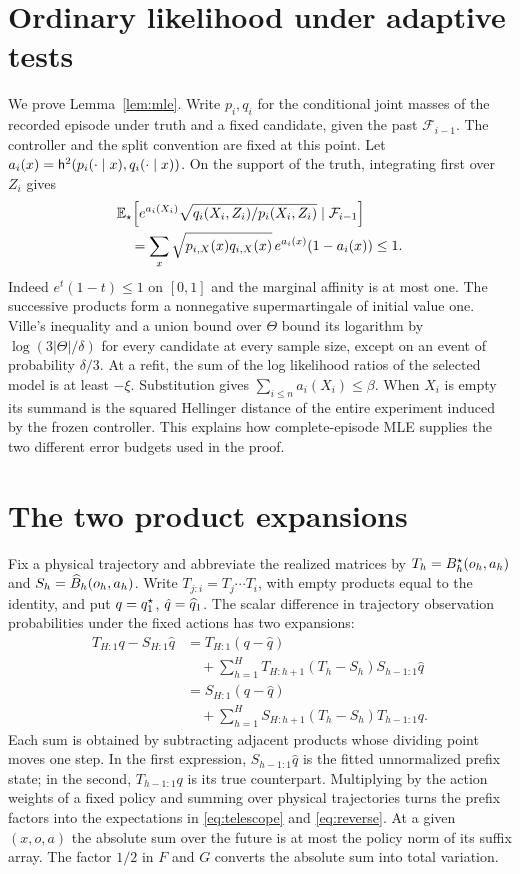 \section{Ordinary likelihood under adaptive tests}\label{app:likelihood}
We prove Lemma~\ref{lem:mle}. Write $p_i,q_i$ for the conditional joint masses of the recorded episode under truth and a fixed candidate, given the past $\mathcal F_{i-1}$. The controller and the split convention are fixed at this point. Let $a_i(x)=\mathsf h^2(p_i(\cdot\mid x),q_i(\cdot\mid x))$. On the support of the truth, integrating first over $Z_i$ gives
\begin{align*}
 &\mathbb E_\star\!\left[e^{a_i(X_i)}
 \sqrt{q_i(X_i,Z_i)/p_i(X_i,Z_i)}\mid\mathcal F_{i-1}\right]\\
 &\quad=\sum_x\sqrt{p_{i,X}(x)q_{i,X}(x)}
       \,e^{a_i(x)}(1-a_i(x))\le1 .
\end{align*}
Indeed $e^t(1-t)\le1$ on $[0,1]$ and the marginal affinity is at most one. The successive products form a nonnegative supermartingale of initial value one. Ville's inequality and a union bound over $\Theta$ bound its logarithm by $\log(3|\Theta|/\delta)$ for every candidate at every sample size, except on an event of probability $\delta/3$. At a refit, the sum of the log likelihood ratios of the selected model is at least $-\xi$. Substitution gives $\sum_{i\le n}a_i(X_i)\le\beta$. When $X_i$ is empty its summand is the squared Hellinger distance of the entire experiment induced by the frozen controller. This explains how complete-episode MLE supplies the two different error budgets used in the proof.

\section{The two product expansions}\label{app:product}
Fix a physical trajectory and abbreviate the realized matrices by $T_h=B_h^\star(o_h,a_h)$ and $S_h=\widehat B_h(o_h,a_h)$. Write $T_{j:i}=T_j\cdots T_i$, with empty products equal to the identity, and put $q=q_1^\star$, $\hat q=\widehat q_1$. The scalar difference in trajectory observation probabilities under the fixed actions has two expansions:
\begin{align*}
 T_{H:1}q-S_{H:1}\hat q
 &=T_{H:1}(q-\hat q)\\
 &\quad+\sum_{h=1}^H T_{H:h+1}(T_h-S_h)S_{h-1:1}\hat q\\
 &=S_{H:1}(q-\hat q)\\
 &\quad+\sum_{h=1}^H S_{H:h+1}(T_h-S_h)T_{h-1:1}q .
\end{align*}
Each sum is obtained by subtracting adjacent products whose dividing point moves one step. In the first expression, $S_{h-1:1}\hat q$ is the fitted unnormalized prefix state; in the second, $T_{h-1:1}q$ is its true counterpart. Multiplying by the action weights of a fixed policy and summing over physical trajectories turns the prefix factors into the expectations in \eqref{eq:telescope} and \eqref{eq:reverse}. At a given $(x,o,a)$ the absolute sum over the future is at most the policy norm of its suffix array. The factor $1/2$ in $F$ and $G$ converts the absolute sum into total variation.

